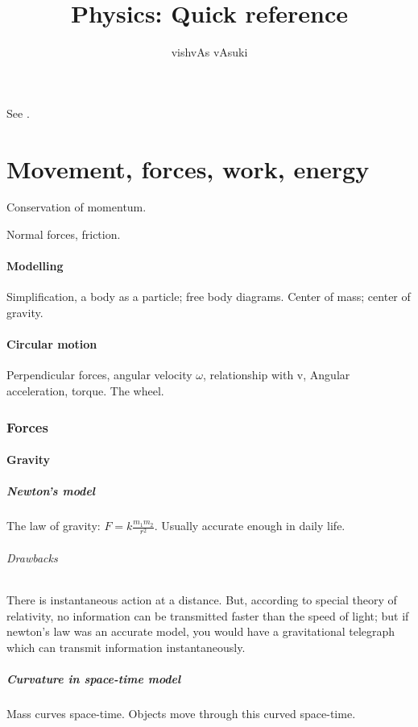 \documentclass{article}
\title{Physics: Quick reference}
\author{vishvAs vAsuki}
\begin{document}
\maketitle

See \cite{resnickHalliday}.

\part{Movement, forces, work, energy}
Conservation of momentum.

Normal forces, friction.

\subsection{Modelling}
Simplification, a body as a particle; free body diagrams. Center of mass; center of gravity.

\subsection{Circular motion}
Perpendicular forces, angular velocity $\omega$, relationship with v, Angular acceleration, torque. The wheel.

\section{Forces}
\subsection{Gravity}
\subsubsection{Newton's model}
The law of gravity: $F = k \frac{m_{1}m_{2}}{r^{2}}$. Usually accurate enough in daily life.

\paragraph*{Drawbacks}
There is instantaneous action at a distance. But, according to special theory of relativity, no information can be transmitted faster than the speed of light; but if newton's law was an accurate model, you would have a gravitational telegraph which can transmit information instantaneously.

\subsubsection{Curvature in space-time model}
Mass curves space-time. Objects move through this curved space-time.
\end{document}
